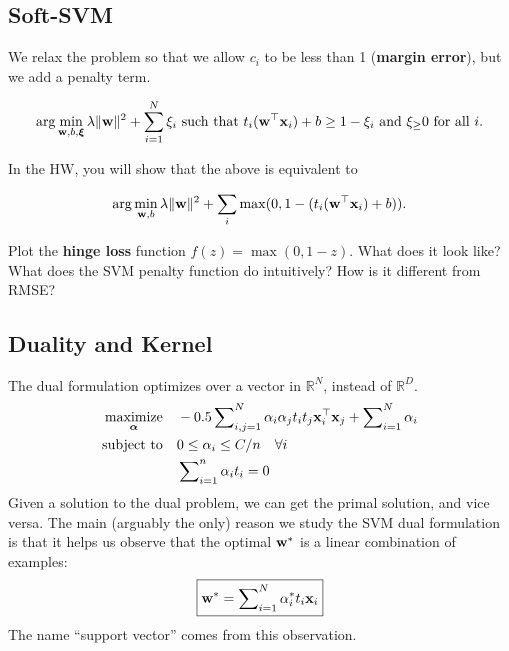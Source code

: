 \documentclass{discussion}
\begin{document}
\subsection{Soft-SVM}

We relax the problem so that we allow $c_i$ to be less than 1 (\textbf{margin error}), but we add a penalty term.

\begin{equation}
    \arg\min_{\mathbf{w}, b, \boldsymbol{\xi}} \lambda\|\mathbf{w}\|^2 + \sum_{i=1}^{N} \xi_i \ \text{such that $t_{i} (\mathbf{w}^\top \mathbf{x}_{i}) + b \geq 1 - \xi_i$ and $\xi_ \geq 0$ for all $i$.}
\end{equation}

In the HW, you will show that the above is equivalent to 

\newcommand{\Lhinge}{L_{\text{hinge}}}
\begin{equation}
\label{eq:svm_primal}
    \arg\min_{\mathbf{w}, b} \lambda\|\mathbf{w}\|^2 + \sum_i \max(0,1 - (t_{i} (\mathbf{w}^\top \mathbf{x}_{i}) + b)).
\end{equation}
\begin{exercise}
  Plot the \textbf{hinge loss} function $f(z) = \max(0, 1 - z)$. What does it look like? What does the SVM penalty function do intuitively? How is it different from RMSE?
\end{exercise}


\subsection{Duality and Kernel}

The dual formulation optimizes over a vector in $\mathbb{R}^N$, instead of $\mathbb{R}^D$.
    \begin{align*}
    \underset{\boldsymbol{\alpha}}{\text{maximize}} \quad &  -0.5 \sum \nolimits_{i,j = 1}^N \alpha_i \alpha_j t_i t_j \mathbf{x}_i^\top \mathbf{x}_j + \sum \nolimits_{i = 1}^N \alpha_i\\
    \text{subject to} \quad & 0 \leq \alpha_i \leq C/n \quad \forall i\ \\
    \quad & \sum \nolimits_{i=1}^n \alpha_i t_i = 0    
    \end{align*} 
Given a solution to the dual problem, we can get the primal solution, and vice versa. The main (arguably the only) reason we study the SVM dual formulation is that it helps us observe that the optimal  $\mathbf{w}^*$ is a linear combination of examples:
\[\boxed{ \mathbf{w}^* = \sum \nolimits_{i=1}^N \alpha_i^* t_i \mathbf{x}_i }\]
The name ``support vector'' comes from this observation.
\end{document}
